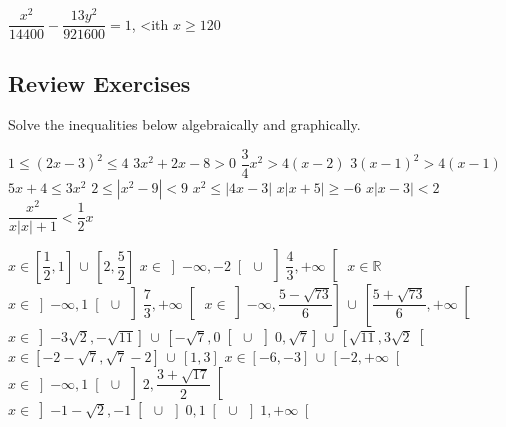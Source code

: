 \begin{Answer}\phantom{}
    $\dfrac{x^2}{14400} - \dfrac{13y^2}{921600} = 1$, <ith $x \geq 120$
\end{Answer}
    
\pagebreak    
\subsection*{Review Exercises}
\begin{Exercise} Solve the inequalities below algebraically and graphically.
	\begin{multicols}{2}
			\ifanalysis\Question[difficulty = 1]\fi\ifcalculus\Question[difficulty = 2]\fi $1\leq (2x-3)^2 \leq 4 $ 
			\Question[difficulty = 1] $3x^2+2x-8>0$ 
			\Question[difficulty = 1] $\dfrac{3}{4}x^2>4(x-2)$  
			\Question[difficulty = 1] $3(x-1)^2>4(x-1)$ 
			\Question[difficulty = 1] $5x+4 \leq 3x^2$ 
			\ifanalysis\Question[difficulty = 2]\fi\ifcalculus\Question[difficulty = 3]\fi $ 2 \leq |x^2-9| < 9$
			\Question[difficulty = 2] $ x^2 \leq |4x-3|$ 
			\Question[difficulty = 2] $ x|x+5| \geq -6$ 
			\Question[difficulty = 2] $ x|x-3| < 2$ 
			\Question[difficulty = 3] $\dfrac{x^2}{x|x|+1} < \dfrac{1}{2}x $
			\EndCurrentQuestion
	\end{multicols}

\end{Exercise}

\begin{Answer}\phantom{}
    \begin{multicols}{2}
    
    	\Question $x \in \left[\dfrac{1}{2}, 1 \right] \, \cup \, \left[2,\dfrac{5}{2} \right] $
    	\Question $x \in \left]-\infty, -2\right[ \, \cup \, \left]\dfrac{4}{3}, +\infty \right[$ 
    	\Question $x \in \mathbb{R}$
    	\Question $x \in \left]-\infty, 1\right[ \, \cup \, \left]\dfrac{7}{3}, +\infty \right[$
        \Question $x \in \left]-\infty, \dfrac{5-\sqrt{73}}{6}\right] \, \cup \, \left[\dfrac{5+\sqrt{73}}{6}, +\infty \right[$ 
    	\Question $x \in \left]-3\sqrt{2},-\sqrt{11} \right] \, \cup \, \left[-\sqrt{7},0 \right[ \, \cup \, \left]0, \sqrt{7}\right] \, \cup\, \left[ \sqrt{11}, 3\sqrt{2}\right[$  
    	\Question $x \in \left[-2-\sqrt{7}, \sqrt{7}-2 \right] \, \cup \, \left[1,3 \right] $ 
    	\Question $x \in \left[-6, -3 \right] \, \cup \, \left[-2,+\infty \right[ $ 
    	\Question $x \in \left]-\infty,1 \right[ \, \cup \, \left]2, \dfrac{3+\sqrt{17}}{2} \right[ $ 
    	\Question $x \in \left]-1-\sqrt{2},-1 \right[ \, \cup \, \left]0,1 \right[ \, \cup \, \left]1, +\infty \right[$  
    \EndCurrentQuestion
    \end{multicols}
\end{Answer}

\fi %



